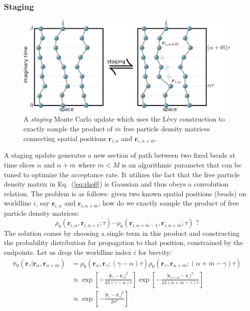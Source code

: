 \documentclass[prb,aps,amssym,nofootinbib,floatfix,notitlepage]{revtex4-1}
\renewcommand{\vec}[1]{\boldsymbol{#1}}
\renewcommand{\eqref}[1]{Eq.~(\ref{#1})}
\begin{document}
\subsubsection{Staging}
%
\begin{figure}
\begin{center}
\includegraphics[width=0.75\columnwidth]{Figures/staging.pdf}
\end{center}
\caption{A \emph{staging} Monte Carlo update which uses the L\'{e}vy
construction to exactly sample the product of $\overline{m}$ free particle
density matrices connecting spatial positions $\vec{r}_{i,\alpha}$ and
$\vec{r}_{i,\alpha+\overline{m}}$.}
\label{fig:staging}
 \end{figure}
%
A staging update \cite{Sprik:1985bz} generates a new section of path between
two fixed beads at time slices $\alpha$ and $\alpha+\overline{m}$ where
$\overline{m} < M$ is an algorithmic parameter that can be tuned to optimize
the acceptance rate. It
utilizes the fact that the free particle density matrix in \eqref{eq:rho0} is
Gaussian and thus obeys a convolution relation.  The problem is as follows:
given two known spatial positions (beads) on worldline $i$, say $\vec{r}_{i,\alpha}$
and $\vec{r}_{i,\alpha+\overline{m}}$, how do we exactly sample the product of free particle
density matrices:
%
\begin{equation}
    \rho_0(\vec{r}_{i,\alpha},\vec{r}_{i,\alpha+1};\tau) \cdots
    \rho_0(\vec{r}_{i,\alpha+\overline{m}-1},\vec{r}_{i,\alpha+\overline{m}};\tau)\; ?
\end{equation}
%
The solution comes by choosing a single term in this product and constructing
the probability distribution for propagation to that position, constrained by the
endpoints. Let us drop the worldline index $i$ for brevity:  
%
\begin{align}
    \pi_0(\vec{r}_\gamma| \vec{r}_{\alpha},\vec{r}_{\alpha+\overline{m}}) &=
    \rho_0(\vec{r}_\alpha,\vec{r}_\gamma;(\gamma-\alpha)\tau) 
\rho_0(\vec{r}_\gamma,\vec{r}_{\alpha+\overline{m}};(\alpha+\overline{m}-\gamma)\tau) \nonumber \\
&\propto 
\exp\left[-\frac{|\vec{r}_\gamma-\vec{r}_{\alpha}|^2}{4\lambda (\gamma-\alpha)\tau} \right]
\exp\left[-\frac{|\vec{r}_{\alpha+\overline{m}}-\vec{r}_{\gamma}|^2}{4\lambda
(\alpha+\overline{m}-\gamma)\tau} \right]
\nonumber \\
&\propto \exp\left[-\frac{|\vec{r}_\gamma-\overline{\vec{r}}_{\gamma}|^2}{2 \sigma^2}\right]
\label{eq:pi0}
\end{align}
\end{document}
